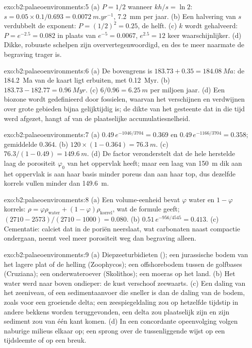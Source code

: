 \begin{solution}{exo:b2:palaeoenvironments:5}
(a) $P = 1/2$ wanneer $kh/s = \ln 2$: $s = 0.05 \times 0.1/0.693 = \qty{0.0072}{m.yr^{-1}}$,
\qty{7.2}{mm} per jaar. (b) Een halvering van $s$ verdubbelt de exponent: $P = (1/2)^2 = 0.25$, de helft.
(c) $k$ wordt gehalveerd: $P = e^{-2.5} = 0.082$ in plaats van $e^{-5} = 0.0067$, $e^{2.5} = 12$ keer
waarschijnlijker. (d) Dikke, robuuste schelpen zijn oververtegenwoordigd, en des te meer naarmate de begraving trager is.
\end{solution}

\begin{solution}{exo:b2:palaeoenvironments:6}
(a) De bovengrens is $183.73 + 0.35 = \qty{184.08}{Ma}$: de \qty{184.2}{Ma} van de kaart ligt
erbuiten, met \qty{0.12}{Myr}. (b) $183.73 - 182.77 = \qty{0.96}{Myr}$. (c) $6/0.96 =
\qty{6.25}{m}$ per miljoen jaar. (d) Een biozone wordt gedefinieerd door fossielen, waarvan het verschijnen en
verdwijnen over grote gebieden bijna gelijktijdig is; de dikte van het gesteente dat in
die tijd werd afgezet, hangt af van de plaatselijke accumulatiesnelheid.
\end{solution}

\begin{solution}{exo:b2:palaeoenvironments:7}
(a) $0.49\,e^{-1046/3704} = 0.369$ en $0.49\,e^{-1166/3704} = 0.358$; gemiddelde $0.364$. (b) $120
\times (1 - 0.364) = \qty{76.3}{m}$. (c) $76.3/(1 - 0.49) = \qty{149.6}{m}$. (d) De factor
veronderstelt dat de hele herstelde laag de porositeit $\varphi_0$ van het oppervlak heeft; maar een laag
van \qty{150}{m} dik aan het oppervlak is aan haar basis minder poreus dan aan haar top, dus dezelfde korrels
vullen minder dan \qty{149.6}{m}.
\end{solution}

\begin{solution}{exo:b2:palaeoenvironments:8}
(a) Een volume-eenheid bevat $\varphi$ water en $1 - \varphi$ korrels: $\rho = \varphi
\rho_{\text{water}} + (1 - \varphi)\rho_{\text{korrel}}$, wat de formule geeft; $(2710 -
2573)/(2710 - 1000) = 0.080$. (b) $0.51\,e^{-956/4545} = 0.413$. (c) Cementatie: calciet dat
in de poriën neerslaat, wat carbonaten naast compactie ondergaan, neemt veel meer porositeit weg
dan begraving alleen.
\end{solution}

\begin{solution}{exo:b2:palaeoenvironments:9}
(a) Diepzeeturbidieten (); een jurassische bodem van het lagere plat of de helling
(Zoophycos); een offshorebodem tussen de golfbases (Cruziana); een onderwateroever (Skolithos); een
moeras op het land. (b) Het water werd naar boven ondieper: de kust verschoof zeewaarts. (c) Een daling van het zeeniveau,
of een sedimentaanvoer die sneller is dan de daling van de bodem, zoals voor een groeiende delta; een zeespiegeldaling zou
op hetzelfde tijdstip in andere bekkens worden teruggevonden, een delta zou plaatselijk zijn en zijn sediment zou
van één kant komen. (d) In een concordante opeenvolging volgen naburige milieus elkaar op; een
sprong over de tussenliggende wijst op een tijdsleemte of op een breuk.
\end{solution}


